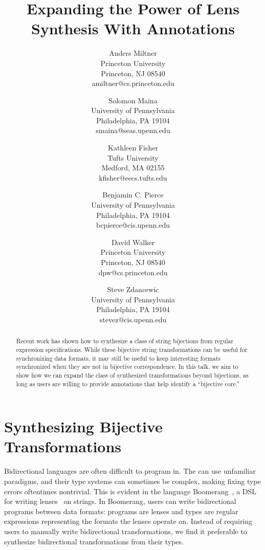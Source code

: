 \documentclass[a4paper]{article}
\title{Expanding the Power of Lens Synthesis With Annotations}
\author{
Anders Miltner \\ Princeton University\\
Princeton, NJ 08540 \\ amiltner@cs.princeton.edu
\and
Solomon Maina \\ University of Pennsylvania\\
Philadelphia, PA 19104 \\ smaina@seas.upenn.edu
\and
Kathleen Fisher \\ Tufts University\\
Medford, MA 02155 \\ kfisher@eecs.tufts.edu
\and
Benjamin C. Pierce \\ University of Pennsylvania\\
Philadelphia, PA 19104 \\ bcpierce@cis.upenn.edu
\and
David Walker \\ Princeton University\\
Princeton, NJ 08540 \\ dpw@cs.princeton.edu
\and
Steve Zdancewic \\ University of Pennsylvania\\
Philadelphia, PA 19104 \\ stevez@cis.upenn.edu
}
\begin{document}
\maketitle



\begin{abstract}
  Recent work has shown how to synthesize a class of string bijections from
  regular expression specifications. While these bijective string
  transformations can be useful for synchronizing data formats, it may still be
  useful to keep interesting formats synchronized when they are not in bijective
  correspondence. In this talk, we aim to show how we can expand the class of
  synthesized transformations beyond bijections, as long as users are willing to
  provide annotations that help identify a ``bijective core.''
\end{abstract}
\vskip 32pt


\section{Synthesizing Bijective Transformations}

Bidirectional languages are often difficult to program in. The can use
unfamiliar paradigms, and their type systems can sometimes be complex, making
fixing type errors oftentimes nontrivial. This is evident in the language
Boomerang~\cite{boomerang}, a DSL for writing lenses~\cite{Focal2005-long2}
on strings. In Boomerang, users can write bidirectional programs between data
formats: programs are lenses and types are regular expressions representing the
formats the lenses operate on. Instead of requiring users to manually write
bidirectional transformations, we find it preferable to synthesize bidirectional
transformations from their types.
\end{document}
